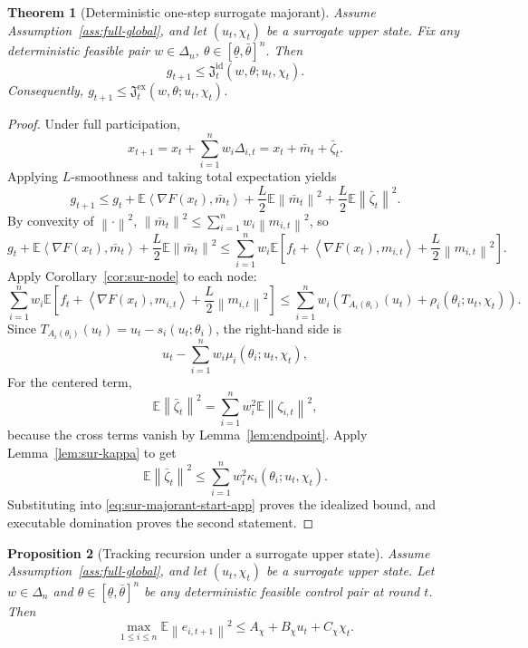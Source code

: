 \documentclass{article}
\newtheorem{theorem}{Theorem}[section]
\newtheorem{proposition}[theorem]{Proposition}
\theoremstyle{definition}
\newcommand{\EE}{\mathbb E}
\newcommand{\norm}[1]{\left\lVert #1\right\rVert}
\newcommand{\ip}[2]{\left\langle #1,#2\right\rangle}
\begin{document}
\begin{theorem}[Deterministic one-step surrogate majorant]
\label{th:sur-majorant}
Assume Assumption~\ref{ass:full-global}, and let $(u_t,\chi_t)$ be a surrogate
upper state. Fix any deterministic feasible pair
$w\in\Delta_n$, $\theta\in[\underline\theta,\bar\theta]^n$. Then
\[
g_{t+1}
\le
\mathfrak J_t^{\mathrm{id}}(w,\theta;u_t,\chi_t).
\]
Consequently, $
g_{t+1}
\le
\mathfrak J_t^{\mathrm{ex}}(w,\theta;u_t,\chi_t)$.
\end{theorem}

\begin{proof}
Under full participation,
\[
x_{t+1}=x_t+\sum_{i=1}^n w_i\Delta_{i,t}=x_t+\bar m_t+\bar\zeta_t.
\]
Applying $L$-smoothness and taking total expectation yields
\begin{equation}
g_{t+1}
\le
g_t
+
\EE\ip{\nabla F(x_t)}{\bar m_t}
+
\frac{L}{2}\EE\norm{\bar m_t}^2
+
\frac{L}{2}\EE\norm{\bar\zeta_t}^2.
\label{eq:sur-majorant-start-app}\end{equation}
By convexity of $\norm{\cdot}^2$, $
\norm{\bar m_t}^2\le \sum_{i=1}^n w_i\norm{m_{i,t}}^2$,
so
\[
g_t+\EE\ip{\nabla F(x_t)}{\bar m_t}+\frac{L}{2}\EE\norm{\bar m_t}^2
\le
\sum_{i=1}^n w_i
\EE\!\left[
f_t+\ip{\nabla F(x_t)}{m_{i,t}}+\frac{L}{2}\norm{m_{i,t}}^2
\right].
\]
Apply Corollary~\ref{cor:sur-node} to each node:
\[
\sum_{i=1}^n w_i
\EE\!\left[
f_t+\ip{\nabla F(x_t)}{m_{i,t}}+\frac{L}{2}\norm{m_{i,t}}^2
\right]
\le
\sum_{i=1}^n w_i\left(T_{A_i(\theta_i)}(u_t)+\rho_i(\theta_i;u_t,\chi_t)\right).
\]
Since $T_{A_i(\theta_i)}(u_t)=u_t-s_i(u_t;\theta_i)$, the right-hand side is
\[
u_t-\sum_{i=1}^n w_i\mu_i(\theta_i;u_t,\chi_t),
\]
For the centered term,
\[
\EE\norm{\bar\zeta_t}^2
=
\sum_{i=1}^n w_i^2\EE\norm{\zeta_{i,t}}^2,
\]
because the cross terms vanish by Lemma~\ref{lem:endpoint}. Apply
Lemma~\ref{lem:sur-kappa} to get
\[
\EE\norm{\bar\zeta_t}^2\le \sum_{i=1}^n w_i^2\kappa_i(\theta_i;u_t,\chi_t).
\]
Substituting into \eqref{eq:sur-majorant-start-app} proves the idealized bound,
and executable domination proves the second statement.
\end{proof}

\begin{proposition}[Tracking recursion under a surrogate upper state]
\label{prop:sur-track}
Assume Assumption~\ref{ass:full-global}, and let $(u_t,\chi_t)$ be a surrogate
upper state. Let $w\in\Delta_n$ and $\theta\in[\underline\theta,\bar\theta]^n$
be any deterministic feasible control pair at round $t$. Then
\[
\max_{1\le i\le n}\EE\norm{e_{i,t+1}}^2
\le
A_\chi+B_\chi u_t+C_\chi\chi_t.
\]
\end{proposition}
\end{document}
